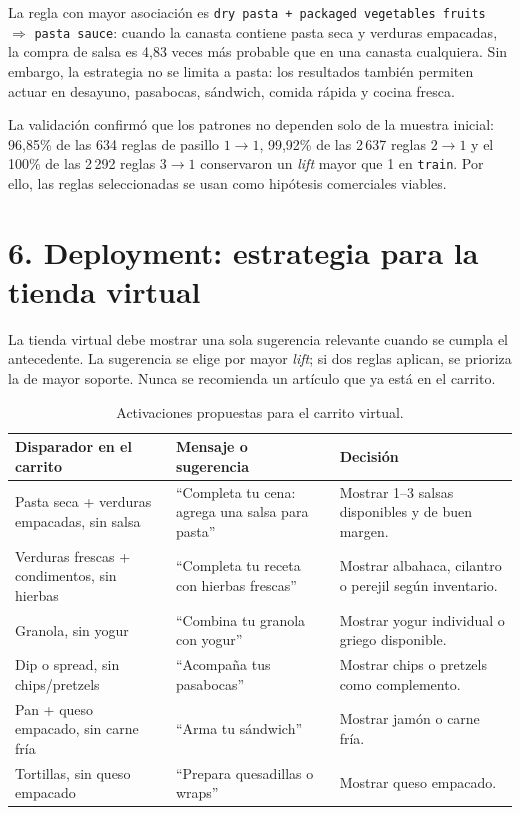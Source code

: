 \documentclass[10pt,letterpaper]{article}
\newcommand{\pct}[1]{#1\%}
\begin{document}
La regla con mayor asociación es \texttt{dry pasta + packaged vegetables fruits} $\Rightarrow$ \texttt{pasta sauce}: cuando la canasta contiene pasta seca y verduras empacadas, la compra de salsa es 4,83 veces más probable que en una canasta cualquiera. Sin embargo, la estrategia no se limita a pasta: los resultados también permiten actuar en desayuno, pasabocas, sándwich, comida rápida y cocina fresca.

La validación confirmó que los patrones no dependen solo de la muestra inicial: \pct{96,85} de las 634 reglas de pasillo $1\rightarrow1$, \pct{99,92} de las 2\,637 reglas $2\rightarrow1$ y el 100\% de las 2\,292 reglas $3\rightarrow1$ conservaron un \textit{lift} mayor que 1 en \texttt{train}. Por ello, las reglas seleccionadas se usan como hipótesis comerciales viables.

\section*{6. Deployment: estrategia para la tienda virtual}

La tienda virtual debe mostrar una sola sugerencia relevante cuando se cumpla el antecedente. La sugerencia se elige por mayor \textit{lift}; si dos reglas aplican, se prioriza la de mayor soporte. Nunca se recomienda un artículo que ya está en el carrito.

\begin{table}[H]
\centering
\caption{Activaciones propuestas para el carrito virtual.}
\scriptsize
\begin{tabularx}{\linewidth}{Y Y Y}
\toprule
Disparador en el carrito & Mensaje o sugerencia & Decisión \\
\midrule
Pasta seca + verduras empacadas, sin salsa & ``Completa tu cena: agrega una salsa para pasta'' & Mostrar 1--3 salsas disponibles y de buen margen. \\
Verduras frescas + condimentos, sin hierbas & ``Completa tu receta con hierbas frescas'' & Mostrar albahaca, cilantro o perejil según inventario. \\
Granola, sin yogur & ``Combina tu granola con yogur'' & Mostrar yogur individual o griego disponible. \\
Dip o spread, sin chips/pretzels & ``Acompaña tus pasabocas'' & Mostrar chips o pretzels como complemento. \\
Pan + queso empacado, sin carne fría & ``Arma tu sándwich'' & Mostrar jamón o carne fría. \\
Tortillas, sin queso empacado & ``Prepara quesadillas o wraps'' & Mostrar queso empacado. \\
\bottomrule
\end{tabularx}
\end{table}
\end{document}
